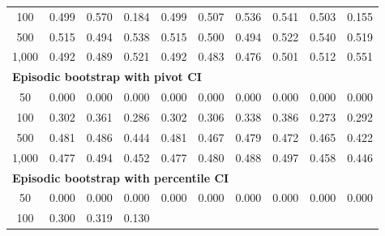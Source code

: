\documentclass{article}
\numberwithin{equation}{section}
\begin{document}
\begin{table}[ht]
\begin{tabular}{c|ccc|cccccc}
100
& \cellcolor{covheat!100!white}0.499 & \cellcolor{covheat!100!white}0.570 & 0.184
& \cellcolor{covheat!100!white}0.499 & \cellcolor{covheat!100!white}0.507 & \cellcolor{covheat!100!white}0.536 & \cellcolor{covheat!100!white}0.541 & \cellcolor{covheat!100!white}0.503 & 0.155 \\
500
& \cellcolor{covheat!100!white}0.515 & \cellcolor{covheat!97!white}0.494 & \cellcolor{covheat!100!white}0.538
& \cellcolor{covheat!100!white}0.515 & \cellcolor{covheat!100!white}0.500 & \cellcolor{covheat!97!white}0.494 & \cellcolor{covheat!100!white}0.522 & \cellcolor{covheat!100!white}0.540 & \cellcolor{covheat!100!white}0.519 \\
1{,}000
& \cellcolor{covheat!96!white}0.492 & \cellcolor{covheat!94!white}0.489 & \cellcolor{covheat!100!white}0.521
& \cellcolor{covheat!96!white}0.492 & \cellcolor{covheat!91!white}0.483 & \cellcolor{covheat!88!white}0.476 & \cellcolor{covheat!100!white}0.501 & \cellcolor{covheat!100!white}0.512 & \cellcolor{covheat!100!white}0.551 \\
\hline
\multicolumn{10}{l}{\textbf{Episodic bootstrap with pivot CI}} \\ \hline
50
& 0.000 & 0.000 & 0.000
& 0.000 & 0.000 & 0.000 & 0.000 & 0.000 & 0.000 \\
100
& \cellcolor{covheat!1!white}0.302 & \cellcolor{covheat!30!white}0.361 & 0.286
& \cellcolor{covheat!1!white}0.302 & \cellcolor{covheat!3!white}0.306 & \cellcolor{covheat!19!white}0.338 & \cellcolor{covheat!43!white}0.386 & 0.273 & 0.292 \\
500
& \cellcolor{covheat!90!white}0.481 & \cellcolor{covheat!93!white}0.486 & \cellcolor{covheat!72!white}0.444
& \cellcolor{covheat!90!white}0.481 & \cellcolor{covheat!84!white}0.467 & \cellcolor{covheat!89!white}0.479 & \cellcolor{covheat!86!white}0.472 & \cellcolor{covheat!83!white}0.465 & \cellcolor{covheat!61!white}0.422 \\
1{,}000
& \cellcolor{covheat!88!white}0.477 & \cellcolor{covheat!97!white}0.494 & \cellcolor{covheat!76!white}0.452
& \cellcolor{covheat!88!white}0.477 & \cellcolor{covheat!90!white}0.480 & \cellcolor{covheat!94!white}0.488 & \cellcolor{covheat!98!white}0.497 & \cellcolor{covheat!79!white}0.458 & \cellcolor{covheat!73!white}0.446 \\
\hline
\multicolumn{10}{l}{\textbf{Episodic bootstrap with percentile CI}} \\ \hline
50
& 0.000 & 0.000 & 0.000
& 0.000 & 0.000 & 0.000 & 0.000 & 0.000 & 0.000 \\
100
& 0.300 & \cellcolor{covheat!10!white}0.319 & 0.130

\end{tabular}
\end{table}
\end{document}
